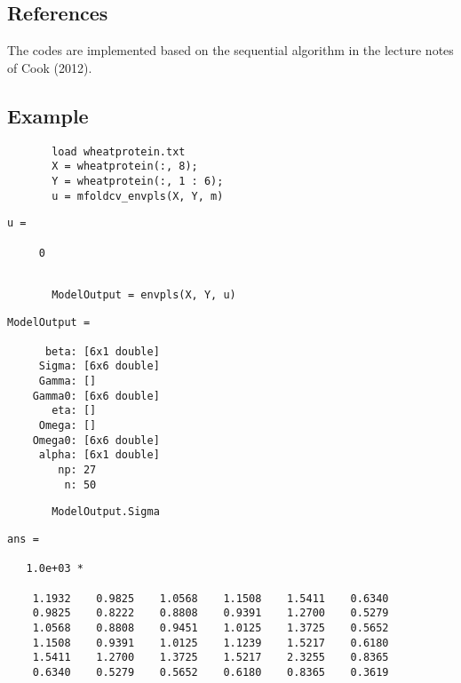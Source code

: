 \documentclass[a4paper,11pt,openany]{memoir}
\begin{document}
\subsection*{References}

\begin{par}
The codes are implemented based on the sequential algorithm in the lecture notes of Cook (2012).
\end{par} \vspace{1em}


\subsection*{Example}


\begin{verbatim}       load wheatprotein.txt
       X = wheatprotein(:, 8);
       Y = wheatprotein(:, 1 : 6);
       u = mfoldcv_envpls(X, Y, m)\end{verbatim}
    
        \color{lightgray}\ttfamily \begin{verbatim}
u =

     0
\end{verbatim}\rmfamily 
\color{black}
\begin{verbatim}

       ModelOutput = envpls(X, Y, u)
\end{verbatim}
        \color{lightgray}\ttfamily \begin{verbatim}
ModelOutput = 

      beta: [6x1 double]
     Sigma: [6x6 double]
     Gamma: []
    Gamma0: [6x6 double]
       eta: []
     Omega: []
    Omega0: [6x6 double]
     alpha: [6x1 double]
        np: 27
         n: 50
\end{verbatim}\rmfamily 
\color{black}

\begin{verbatim}
       ModelOutput.Sigma\end{verbatim}
        \color{lightgray}\ttfamily \begin{verbatim}       
ans =

   1.0e+03 *

    1.1932    0.9825    1.0568    1.1508    1.5411    0.6340
    0.9825    0.8222    0.8808    0.9391    1.2700    0.5279
    1.0568    0.8808    0.9451    1.0125    1.3725    0.5652
    1.1508    0.9391    1.0125    1.1239    1.5217    0.6180
    1.5411    1.2700    1.3725    1.5217    2.3255    0.8365
    0.6340    0.5279    0.5652    0.6180    0.8365    0.3619

\end{verbatim} \rmfamily\color{black}
       
\end{document}
